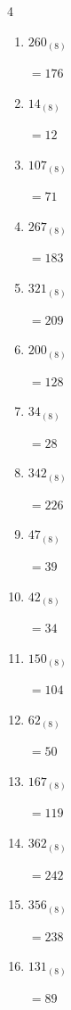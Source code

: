 \begin{multicols}{4}
\begin{enumerate}
  \item $260_{(8)}$

        $=176$

  \item $14_{(8)}$

        $=12$

  \item $107_{(8)}$

        $=71$

  \item $267_{(8)}$

        $=183$

  \item $321_{(8)}$

        $=209$

  \item $200_{(8)}$

        $=128$

  \item $34_{(8)}$

        $=28$

\columnbreak %

\resetques

  \item $342_{(8)}$

        $=226$

  \item $47_{(8)}$

        $=39$

  \item $42_{(8)}$

        $=34$

  \item $150_{(8)}$

        $=104$

  \item $62_{(8)}$

        $=50$

  \item $167_{(8)}$

        $=119$

  \item $362_{(8)}$

        $=242$

  \item $356_{(8)}$

        $=238$

  \item $131_{(8)}$

        $=89$


\end{enumerate}
\end{multicols}
